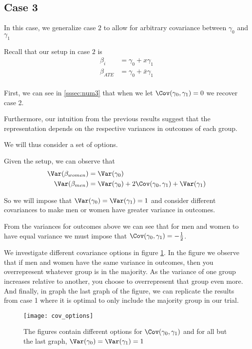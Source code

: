 \subsection*{Case 3}

In this case, we generalize case $2$ to allow for arbitrary covariance between $\gamma_0$ and $\gamma_1$

Recall that our setup in case  $2$ is
\begin{align*}
	\beta_i &=  \gamma_0 + x \gamma_1 \\
	\beta_{ATE} &=  \gamma_0 + \bar{x} \gamma_1 \\
\end{align*}

First, we can see in \ref{sssec:num3} that when we let  $\Cov(\gamma_0, \gamma_1) = 0$ we recover case 2.

Furthermore, our intuition from the previous results suggest that the representation depends on the respective variances in outcomes of each group.

We will thus consider a set of options.

Given the setup, we can observe that
\begin{align*}
	\Var(\beta_{women}) &= \Var(\gamma_0) \\
	\Var(\beta_{men}) &= \Var(\gamma_0) + 2\Cov(\gamma_0, \gamma_1) + \Var(\gamma_1) \\
\end{align*} 

So we will impose that $\Var(\gamma_0) = \Var(\gamma_1) = 1$ and consider different covariances to make men or women have greater variance in outcomes.

From the variances for outcomes above we can see that for men and women to have equal variance we must impose that $\Cov(\gamma_0, \gamma_1) = -\frac{1}{2}$.

We investigate different covariance options in figure \ref{fig:cov_options}. In the figure we observe that if men and women have the same variance in outcomes, then you overrepresent whatever group is in the majority. As the variance of one group increases relative to another, you choose to overrepresent that group even more.
And finally, in graph the last graph of the figure, we can replicate the results from case 1 where it is optimal to only include the majority group in our trial.

\begin{figure}[btp]
	\centering
	\texttt{[image: cov\_options]}
	\caption{The figures contain different options for $\Cov(\gamma_0, \gamma_1)$ and for all but the last graph, $\Var(\gamma_0) = \Var(\gamma_1) = 1$} 
	\label{fig:cov_options}
\end{figure}

